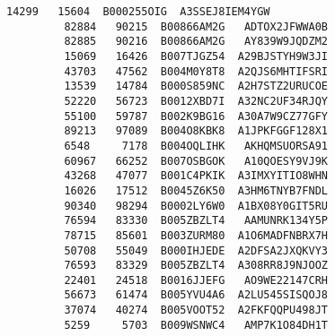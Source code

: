 \documentclass[11pt]{article}
\begin{document}
\begin{Verbatim}[commandchars=\\\{\}]
         14299   15604  B000255OIG  A3SSEJ8IEM4YGW   
         82884   90215  B00866AM2G   ADTOX2JFWWA0B   
         82885   90216  B00866AM2G   AY839W9JQDZM2   
         15069   16426  B007TJGZ54  A29BJSTYH9W3JI   
         43703   47562  B004M0Y8T8  A2QJS6MHTIFSRI   
         13539   14784  B000S859NC  A2H7STZ2URUCOE   
         52220   56723  B0012XBD7I  A32NC2UF34RJQY   
         55100   59787  B002K9BG16  A30A7W9CZ77GFY   
         89213   97089  B004O8KBK8  A1JPKFGGF128X1   
         6548     7178  B004OQLIHK   AKHQMSUORSA91   
         60967   66252  B007OSBGOK   A10QOESY9VJ9K   
         43268   47077  B001C4PKIK  A3IMXYITIO8WHN   
         16026   17512  B0045Z6K50  A3HM6TNYB7FNDL   
         90340   98294  B0002LY6W0  A1BX08Y0GIT5RU   
         76594   83330  B005ZBZLT4   AAMUNRK134Y5P   
         78715   85601  B003ZURM80  A1O6MADFNBRX7H   
         50708   55049  B000IHJEDE  A2DFSA2JXQKVY3   
         76593   83329  B005ZBZLT4  A308RR8J9NJOOZ   
         22401   24518  B0016JJEFG   AO9WE22147CRH   
         56673   61474  B005YVU4A6  A2LU545SISQOJ8   
         37074   40274  B005VOOT52  A2FKFQQPU498JT   
         5259     5703  B009WSNWC4   AMP7K1O84DH1T   
         

\end{Verbatim}
\end{document}
